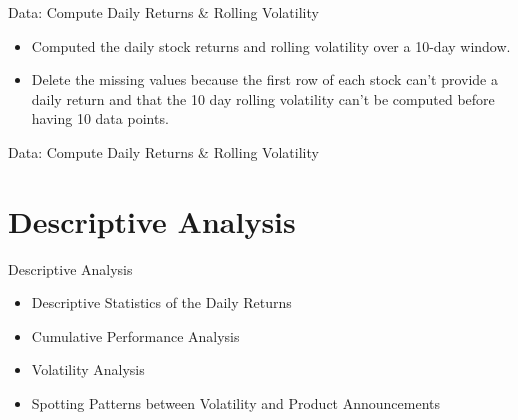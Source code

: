 \documentclass{beamer}
\begin{document}
\begin{frame}{Data: Compute Daily Returns \& Rolling Volatility}
  \begin{itemize}
      \item <1->Computed the daily stock returns and rolling volatility over a 10-day window.
      \item <2->Delete the missing values because the first row of each stock can't provide a daily return and that the 10 day rolling volatility can't be computed before having 10 data points.
      
  \end{itemize}
    
\end{frame}


\begin{frame}{Data: Compute Daily Returns \& Rolling Volatility}
\begin{table}[ht]
    \centering
    \caption{Sample of the final dataset}
    \label{tab:final dataset}
\end{table}
\end{frame}

\section{Descriptive Analysis}

\begin{frame}{Descriptive Analysis}
  \begin{itemize}
    \item Descriptive Statistics of the Daily Returns
    \item Cumulative Performance Analysis
    \item Volatility Analysis
    \item Spotting Patterns between Volatility and Product Announcements
  \end{itemize}
\end{frame}
\end{document}
